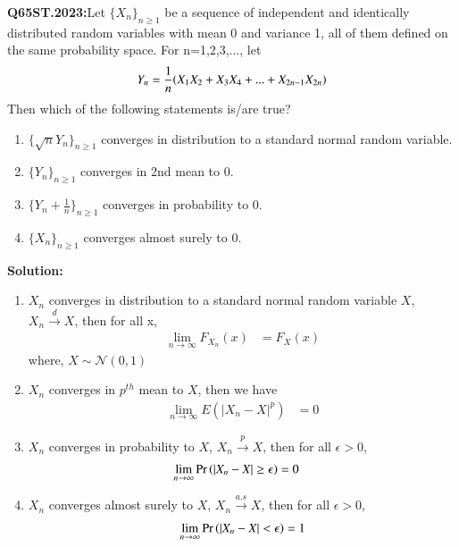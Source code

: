 \documentclass[journal,12pt,Twocolumn]{IEEEtran}
\theoremstyle{remark}
\begin{document}

\textbf{Q65ST.2023:}Let $\{X_n\}_{n \geq 1}$ be a sequence of independent and identically distributed random variables with mean 0 and variance 1, all of them defined on the same
probability space. For n=1,2,3,..., let
\begin{align}
Y_n=\frac{1}{n}{\left(X_1X_2+X_3X_4+...+X_{2n-1}X_{2n}\right)} 
\end{align}
Then which of the following statements is/are true? 
\begin{enumerate}[label=(\Alph*)]
\item $\{\sqrt{n}Y_n\}_{n \geq 1}$ converges in distribution to a standard normal random variable.
\item $\{Y_n\}_{n \geq 1}$ converges in 2nd mean to 0.
\item $\{Y_n+\frac{1}{n}\}_{n \geq 1}$ converges in probability to 0.
\item $\{X_n\}_{n \geq 1}$ converges almost surely to 0.
\end{enumerate}
\textbf{Solution:}\begin{enumerate}
\item $X_n$ converges in distribution to a standard normal random variable $X$, $X_n \xrightarrow{d} X$, then for all x,
\begin{align}
\lim_{n \to \infty} F_{X_n}(x) &= F_X(x)
\end{align}
where, $X \sim \mathcal{N}(0,1)$
\item $X_n$ converges in $p^{th}$ mean to $X$, then we have
\begin{align}
\lim_{n \to \infty} E(|X_n-X|^p)&=0
\end{align}
\item $X_n$ converges in probability to $X$, $X_n \xrightarrow{p} X$, then for all $\epsilon > 0$,
\begin{align}
\lim_{n \to \infty} \Pr\left(|X_n-X|\geq \epsilon\right)&=0
\end{align}
\item $X_n$ converges almost surely to $X$, $X_n \xrightarrow{a.s} X$, then for all $\epsilon > 0$,
\begin{align}
\lim_{n \to \infty} \Pr\left(|X_n - X| <  \epsilon\right) = 1 
\end{align}
\end{enumerate}
\end{document}
